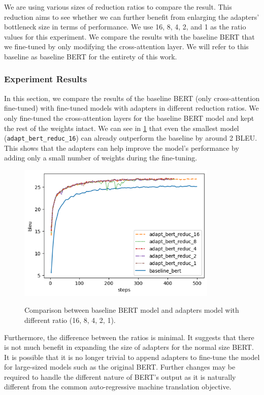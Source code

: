 We are using various sizes of reduction ratios to compare the result. This reduction aims to see whether we can further benefit from enlarging the adapters' bottleneck size in terms of performance. We use 16, 8, 4, 2, and 1 as the ratio values for this experiment. We compare the results with the baseline BERT that we fine-tuned by only modifying the cross-attention layer. We will refer to this baseline as baseline BERT for the entirety of this work.

\subsubsection{Experiment Results}
In this section, we compare the results of the baseline BERT (only cross-attention fine-tuned) with fine-tuned models with adapters in different reduction ratios. We only fine-tuned the cross-attention layers for the baseline BERT model and kept the rest of the weights intact. We can see in \cref{img:adapt_bert_ratio} that even the smallest model (\texttt{adapt\_bert\_reduc\_16}) can already outperform the baseline by around 2 BLEU. This shows that the adapters can help improve the model's performance by adding only a small number of weights during the fine-tuning.

\begin{figure}[]
    {\includegraphics[width=0.85\textwidth]{img/adapter_bert_baseline_adapters.png}}
    \centering
    \caption{Comparison between baseline BERT model and adapters model with different ratio (16, 8, 4, 2, 1).}
    \label{img:adapt_bert_ratio}
\end{figure}

Furthermore, the difference between the ratios is minimal. It suggests that there is not much benefit in expanding the size of adapters for the normal size BERT. It is possible that it is no longer trivial to append adapters to fine-tune the model for large-sized models such as the original BERT. Further changes may be required to handle the different nature of BERT's output as it is naturally different from the common auto-regressive machine translation objective.

